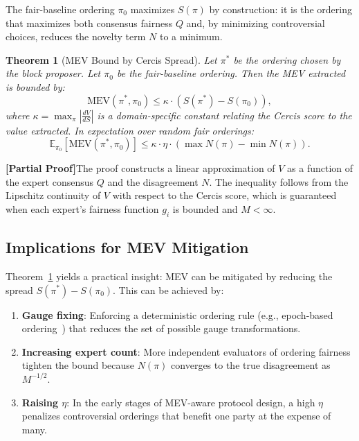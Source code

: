 \documentclass[12pt,a4paper]{article}
\newtheorem{theorem}{Theorem}[section]
\theoremstyle{remark}
\newcommand{\E}{\mathbb{E}}
\newcommand{\Cercis}{\textsf{Cercis}}
\newcommand{\rigorPartial}{\textbf{[Partial Proof]}}
\begin{document}
The fair-baseline ordering $\pi_0$ maximizes $S(\pi)$ by construction: it is
the ordering that maximizes both consensus fairness $Q$ and, by minimizing
controversial choices, reduces the novelty term $N$ to a minimum.

\begin{theorem}[MEV Bound by Cercis Spread]
\label{thm:mev_bound}
Let $\pi^*$ be the ordering chosen by the block proposer. Let $\pi_0$ be the
fair-baseline ordering. Then the MEV extracted is bounded by:
\begin{equation}
\text{MEV}(\pi^*, \pi_0) \leq \kappa \cdot \left( S(\pi^*) - S(\pi_0) \right),
\label{eq:mev_bound}
\end{equation}
where $\kappa = \max_{\pi} \left| \frac{dV}{dS} \right|$ is a domain-specific
constant relating the \Cercis{} score to the value extracted. In expectation
over random fair orderings:
\begin{equation}
\E_{\pi_0}[\text{MEV}(\pi^*, \pi_0)] \leq \kappa \cdot \eta \cdot
(\max N(\pi) - \min N(\pi)).
\label{eq:mev_bound_exp}
\end{equation}
\end{theorem}

\rigorPartial The proof constructs a linear approximation of $V$ as a function
of the expert consensus $Q$ and the disagreement $N$. The inequality follows
from the Lipschitz continuity of $V$ with respect to the \Cercis{} score,
which is guaranteed when each expert's fairness function $g_i$ is bounded and
$M < \infty$.

\subsection{Implications for MEV Mitigation}

Theorem~\ref{thm:mev_bound} yields a practical insight: MEV can be mitigated by
reducing the spread $S(\pi^*) - S(\pi_0)$. This can be achieved by:
\begin{enumerate}
\item \textbf{Gauge fixing}: Enforcing a deterministic ordering rule (e.g.,
epoch-based ordering~\cite{cl2023fair}) that reduces the set of possible
gauge transformations.
\item \textbf{Increasing expert count}: More independent evaluators of ordering
fairness tighten the bound because $N(\pi)$ converges to the true
disagreement as $M^{-1/2}$.
\item \textbf{Raising $\eta$}: In the early stages of MEV-aware protocol
design, a high $\eta$ penalizes controversial orderings that benefit one
party at the expense of many.
\end{enumerate}
\end{document}
